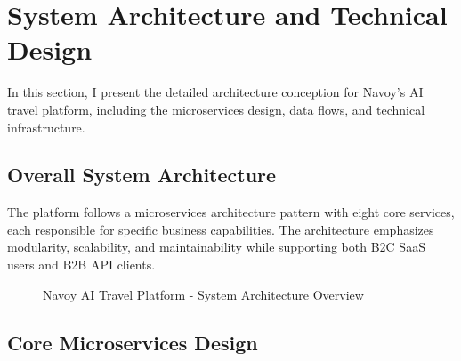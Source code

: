 \section{System Architecture and Technical Design}
In this section, I present the detailed architecture conception for Navoy's AI travel platform, including the microservices design, data flows, and technical infrastructure.

\subsection{Overall System Architecture}
The platform follows a microservices architecture pattern with eight core services, each responsible for specific business capabilities. The architecture emphasizes modularity, scalability, and maintainability while supporting both B2C SaaS users and B2B API clients.

\begin{figure}[H]
    \centering
    \caption{Navoy AI Travel Platform - System Architecture Overview}
    \label{fig:system-architecture}
\end{figure}

\subsection{Core Microservices Design}

